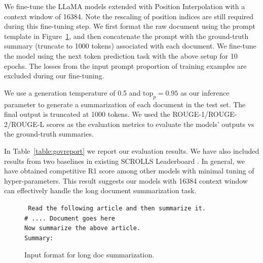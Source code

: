 \documentclass{article} %
\theoremstyle{definition}
\newcommand{\clj}[1]{\textcolor{blue}{[clj: #1]}}
\begin{document}
We fine-tune the LLaMA models extended with Position Interpolation with a context window
of 16384. Note the rescaling of position indices are still required during this fine-tuning step.
We first format the raw document using the prompt template in Figure~\ref{fig:summ-format}, and then concatenate the prompt
with the ground-truth summary (truncate to 1000 tokens) associated with each document. 
We fine-tune the model using the next token prediction task with the above setup for 10 epochs.
The losses from the input prompt proportion of training examples are excluded during our fine-tuning.

We use a generation temperature of 0.5 and $\text{top}_p = 0.95$ as our inference parameter to generate a summarization of each document in the test set. 
The final output is truncated at 1000 tokens.
We used the ROUGE-1/ROUGE-2/ROUGE-L scores \citep{lin-2004-rouge} as the evaluation metrics to evaluate the models' outputs vs the ground-truth summaries.

In Table~\ref{table:govreport} we report our evaluation results. 
We have also included results from two baselines in existing SCROLLS Leaderboard \citep{shaham-etal-2022-scrolls, ainslie2023colt5}. 
In general, we have obtained competitive R1 score among other models with minimal tuning of hyper-parameters. 
This result suggests our models with 16384 context window can effectively handle the long document summarization task.
\begin{figure}[th]
	\texttt{\noindent
        Read the following article and then summarize it. \\
        \# .... Document goes here \\
        Now summarize the above article. \\
        Summary:
    }
	\caption{\small Input format for long doc summarization.}
	\label{fig:summ-format}
\end{figure}
\end{document}
